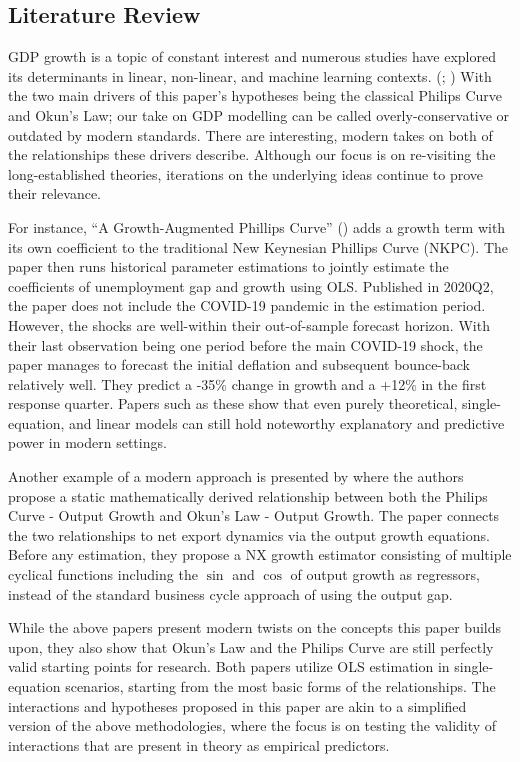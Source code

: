 \subsection{Literature Review}\label{subsec:litreview}
GDP growth is a topic of constant interest and numerous studies have explored its determinants in linear, non-linear, and machine learning contexts. (\cite{maccarrone_gdp_2021}; \cite{mandel_relationship_2019})
With the two main drivers of this paper's hypotheses being the classical Philips Curve and Okun's Law; our take on GDP modelling can be called overly-conservative or outdated by modern standards.
There are interesting, modern takes on both of the relationships these drivers describe.
Although our focus is on re-visiting the long-established theories, iterations on the underlying ideas continue to prove their relevance.

\vspace{\baselineskip}

For instance, \enquote{A Growth-Augmented Phillips Curve} (\cite{tauber_growth-augmented_2020}) adds a growth term with its own coefficient to the traditional New Keynesian Phillips Curve (NKPC).
The paper then runs historical parameter estimations to jointly estimate the coefficients of unemployment gap and growth using OLS.
Published in 2020Q2, the paper does not include the COVID-19 pandemic in the estimation period. 
However, the shocks are well-within their out-of-sample forecast horizon.
With their last observation being one period before the main COVID-19 shock, the paper manages to forecast the initial deflation and subsequent bounce-back relatively well.
They predict a -35\% change in growth and a +12\% in the first response quarter.
Papers such as these show that even purely theoretical, single-equation, and linear models can still hold noteworthy explanatory and predictive power in modern settings.

\vspace{\baselineskip}

Another example of a modern approach is presented by \cite{ferrentino_mathematical_2020} where the authors propose a static mathematically derived relationship between both the Philips Curve - Output Growth and Okun's Law - Output Growth.
The paper connects the two relationships to net export dynamics via the output growth equations.
Before any estimation, they propose a NX growth estimator consisting of multiple cyclical functions including the $\sin$ and $\cos$ of output growth as regressors, instead of the standard business cycle approach of using the output gap.

\vspace{\baselineskip}
While the above papers present modern twists on the concepts this paper builds upon, they also show that Okun's Law and the Philips Curve are still perfectly valid starting points for research.
Both papers utilize OLS estimation in single-equation scenarios, starting from the most basic forms of the relationships.
The interactions and hypotheses proposed in this paper are akin to a simplified version of the above methodologies, where the focus is on testing the validity of interactions that are present in theory as empirical predictors.